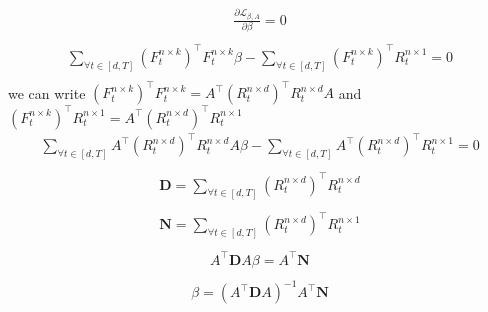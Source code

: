 \begin{equation}\label{expaned_bets_diff_loss}
\begin{aligned}
    \frac{\partial \mathcal{L}_{\beta, A}}{\partial \beta} = 0\\
\end{aligned}
\end{equation}
\begin{equation}
\begin{aligned}
    \sum_{\forall t\in [d,T]} (F^{n\times k}_t)^\top F^{n\times k}_t \beta - \sum_{\forall t\in [d,T]} (F^{n\times k}_t)^\top R^{n\times 1}_t = 0\\
\end{aligned}
\end{equation}
we can write $(F^{n\times k}_t)^\top F^{n\times k}_t = A^\top(R^{n\times d}_{t})^\top R^{n\times d}_{t} A$ and $(F^{n\times k}_t)^\top R^{n\times 1}_{t} = A^\top(R^{n\times d}_{t})^\top R^{n\times 1}_{t}$
\begin{equation}\label{dk2_complexity_method_for_regg}
\begin{aligned} 
    \sum_{\forall t\in [d,T]} A^\top (R^{n\times d}_t)^\top R^{n\times d}_t A \beta - \sum_{\forall t\in [d,T]} A^\top (R^{n\times d}_t)^\top R^{n\times 1}_t = 0\\
\end{aligned}
\end{equation}
\begin{equation} \label{regg_D}
\begin{aligned}
    \mathbf{D} = \sum_{\forall t\in [d,T]} (R^{n\times d}_t)^\top R^{n\times d}_t\\
\end{aligned}
\end{equation}
\begin{equation}\label{regg_N}
\begin{aligned}
     \mathbf{N} = \sum_{\forall t\in [d,T]} (R^{n\times d}_t)^\top R^{n\times 1}_t\\
\end{aligned}
\end{equation}
\begin{equation}
\begin{aligned}
    A^\top \mathbf{D} A \beta = A^\top \mathbf{N}\\
\end{aligned}
\end{equation}
\begin{equation}
\begin{aligned} \label{regg_full_linalg_formula}
    \beta = (A^\top \mathbf{D} A)^{-1} A^\top \mathbf{N}
\end{aligned}
\end{equation}

